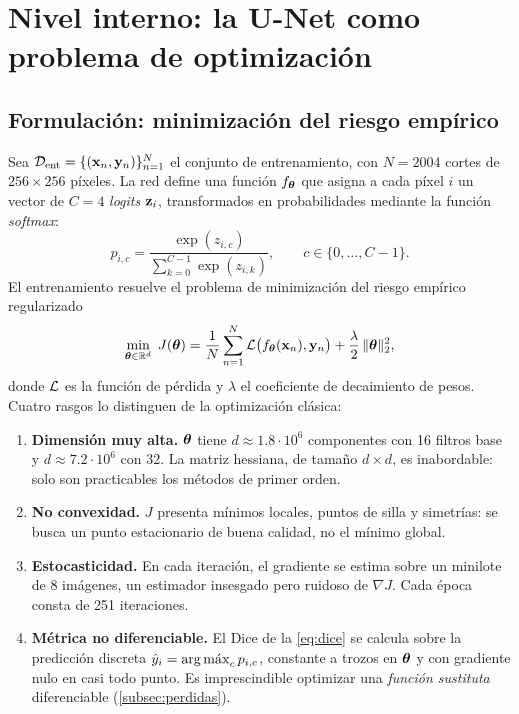 \section{Nivel interno: la U-Net como problema de optimización}\label{sec:unet}

\subsection{Formulación: minimización del riesgo empírico}\label{subsec:erm}

Sea $\mathcal{D}_{\mathrm{ent}} = \{(\mathbf{x}_n,\mathbf{y}_n)\}_{n=1}^{N}$ el conjunto de entrenamiento, con $N=2004$ cortes de $256\times256$ píxeles. La red define una función $f_{\bm{\theta}}$ que asigna a cada píxel $i$ un vector de $C=4$ \emph{logits} $\mathbf{z}_i$, transformados en probabilidades mediante la función \emph{softmax}:
\begin{equation}\label{eq:softmax}
  p_{i,c} = \frac{\exp(z_{i,c})}{\sum_{k=0}^{C-1}\exp(z_{i,k})}, \qquad c \in \{0,\dots,C-1\}.
\end{equation}
El entrenamiento resuelve el problema de minimización del riesgo empírico regularizado
\begin{equation}\label{eq:erm}
  \min_{\bm{\theta}\in\mathbb{R}^{d}} \; J(\bm{\theta}) = \frac{1}{N}\sum_{n=1}^{N} \mathcal{L}\bigl(f_{\bm{\theta}}(\mathbf{x}_n),\mathbf{y}_n\bigr) + \frac{\lambda}{2}\,\lVert\bm{\theta}\rVert_2^2,
\end{equation}
donde $\mathcal{L}$ es la función de pérdida y $\lambda$ el coeficiente de decaimiento de pesos. Cuatro rasgos lo distinguen de la optimización clásica:

\begin{enumerate}
  \item \textbf{Dimensión muy alta.} $\bm{\theta}$ tiene $d \approx 1.8\cdot10^{6}$ componentes con 16 filtros base y $d \approx 7.2\cdot10^{6}$ con 32. La matriz hessiana, de tamaño $d\times d$, es inabordable: solo son practicables los métodos de primer orden.
  \item \textbf{No convexidad.} $J$ presenta mínimos locales, puntos de silla y simetrías: se busca un punto estacionario de buena calidad, no el mínimo global.
  \item \textbf{Estocasticidad.} En cada iteración, el gradiente se estima sobre un minilote de 8 imágenes, un estimador insesgado pero ruidoso de $\nabla J$. Cada época consta de 251 iteraciones.
  \item \textbf{Métrica no diferenciable.} El Dice de la \cref{eq:dice} se calcula sobre la predicción discreta $\hat{y}_i=\operatorname*{arg\,m\acute{a}x}_c p_{i,c}$, constante a trozos en $\bm{\theta}$ y con gradiente nulo en casi todo punto. Es imprescindible optimizar una \emph{función sustituta} diferenciable (\cref{subsec:perdidas}).
\end{enumerate}

